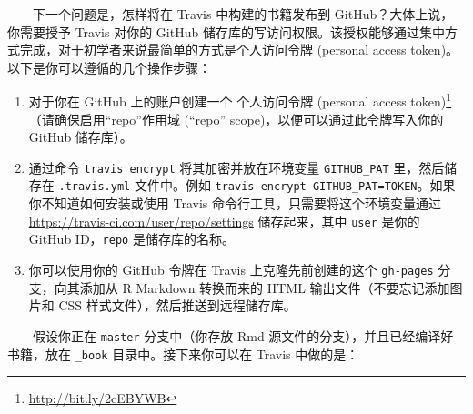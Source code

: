 \documentclass[
  12pt,
]{krantz}
\newenvironment{Shaded}{\begin{snugshade}}{\end{snugshade}}
\newcommand{\AttributeTok}[1]{\textcolor[rgb]{0.77,0.63,0.00}{#1}}
\newcommand{\BuiltInTok}[1]{#1}
\newcommand{\CommentTok}[1]{\textcolor[rgb]{0.56,0.35,0.01}{\textit{#1}}}
\newcommand{\DataTypeTok}[1]{\textcolor[rgb]{0.13,0.29,0.53}{#1}}
\newcommand{\FunctionTok}[1]{\textcolor[rgb]{0.00,0.00,0.00}{#1}}
\newcommand{\NormalTok}[1]{#1}
\newcommand{\PreprocessorTok}[1]{\textcolor[rgb]{0.56,0.35,0.01}{\textit{#1}}}
\newcommand{\StringTok}[1]{\textcolor[rgb]{0.31,0.60,0.02}{#1}}
\newcommand{\VariableTok}[1]{\textcolor[rgb]{0.00,0.00,0.00}{#1}}
\providecommand{\tightlist}{%
  \setlength{\itemsep}{0pt}\setlength{\parskip}{0pt}}
\renewcommand{\href}[2]{#2\footnote{\url{#1}}}
\theoremstyle{definition}
\theoremstyle{definition}
\theoremstyle{definition}
\theoremstyle{definition}
\theoremstyle{remark}
\begin{document}
  下一个问题是，怎样将在 Travis 中构建的书籍发布到 GitHub？大体上说，你需要授予 Travis 对你的 GitHub 储存库的写访问权限。该授权能够通过集中方式完成，对于初学者来说最简单的方式是个人访问令牌 (personal access token)。以下是你可以遵循的几个操作步骤：

\begin{enumerate}
\def\labelenumi{\arabic{enumi}.}
\tightlist
\item
  对于你在 GitHub 上的账户创建一个 \href{http://bit.ly/2cEBYWB}{个人访问令牌 (personal access token)}（请确保启用``repo''作用域 (``repo'' scope)，以便可以通过此令牌写入你的 GitHub 储存库）。
\item
  通过命令 \texttt{travis\ encrypt} 将其加密并放在环境变量 \texttt{GITHUB\_PAT} 里，然后储存在 \texttt{.travis.yml} 文件中。例如 \texttt{travis\ encrypt\ GITHUB\_PAT=TOKEN}。如果你不知道如何安装或使用 Travis 命令行工具，只需要将这个环境变量通过 \url{https://travis-ci.com/user/repo/settings} 储存起来，其中 \texttt{user} 是你的 GitHub ID，\texttt{repo} 是储存库的名称。
\item
  你可以使用你的 GitHub 令牌在 Travis 上克隆先前创建的这个 \texttt{gh-pages} 分支，向其添加从 R Markdown 转换而来的 HTML 输出文件（不要忘记添加图片和 CSS 样式文件），然后推送到远程储存库。
\end{enumerate}

  假设你正在 \texttt{master} 分支中（你存放 Rmd 源文件的分支），并且已经编译好书籍，放在 \texttt{\_book} 目录中。接下来你可以在 Travis 中做的是：

\begin{Shaded}
\end{Shaded}
\end{document}
